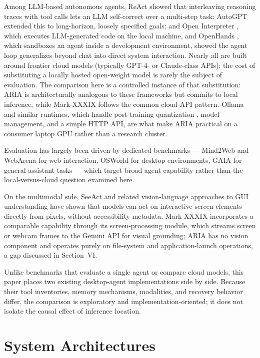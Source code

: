 \documentclass[conference]{IEEEtran}
\begin{document}
Among LLM-based autonomous agents, ReAct \cite{ref4} showed that interleaving reasoning traces with tool calls lets an LLM self-correct over a multi-step task; AutoGPT \cite{ref6} extended this to long-horizon, loosely specified goals; and Open Interpreter \cite{ref7}, which executes LLM-generated code on the local machine, and OpenHands \cite{ref8}, which sandboxes an agent inside a development environment, showed the agent loop generalizes beyond chat into direct system interaction. Nearly all are built around frontier cloud models (typically GPT-4- or Claude-class \cite{ref9} APIs); the cost of substituting a locally hosted open-weight model is rarely the subject of evaluation. The comparison here is a controlled instance of that substitution: ARIA is architecturally analogous to these frameworks but commits to local inference, while Mark-XXXIX follows the common cloud-API pattern. Ollama \cite{ref2} and similar runtimes, which handle post-training quantization \cite{ref20}, model management, and a simple HTTP API, are what make ARIA practical on a consumer laptop GPU rather than a research cluster.

Evaluation has largely been driven by dedicated benchmarks --- Mind2Web \cite{ref16} and WebArena \cite{ref17} for web interaction, OSWorld \cite{ref18} for desktop environments, GAIA \cite{ref19} for general assistant tasks --- which target broad agent capability rather than the local-versus-cloud question examined here.

On the multimodal side, SeeAct \cite{ref10} and related vision-language approaches to GUI understanding have shown that models can act on interactive screen elements directly from pixels, without accessibility metadata. Mark-XXXIX incorporates a comparable capability through its screen-processing module, which streams screen or webcam frames to the Gemini API for visual grounding; ARIA has no vision component and operates purely on file-system and application-launch operations, a gap discussed in Section~VI.

Unlike benchmarks that evaluate a single agent or compare cloud models, this paper places two existing desktop-agent implementations side by side. Because their tool inventories, memory mechanisms, modalities, and recovery behavior differ, the comparison is exploratory and implementation-oriented; it does not isolate the causal effect of inference location.

\section{System Architectures}
\end{document}
